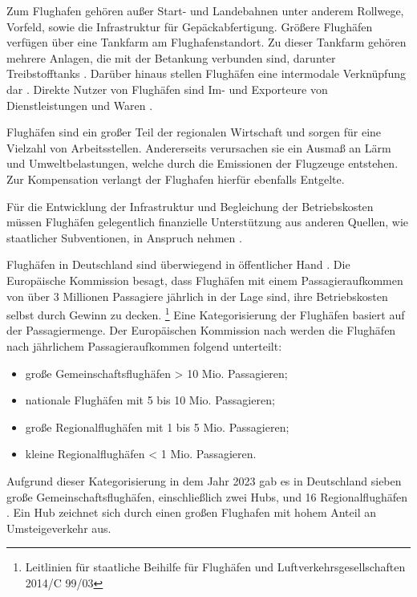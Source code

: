 Zum Flughafen gehören außer Start- und Landebahnen unter anderem 
Rollwege, Vorfeld, sowie die Infrastruktur für Gepäckabfertigung. 
Größere Flughäfen verfügen über eine Tankfarm am Flughafenstandort. 
Zu dieser Tankfarm gehören mehrere Anlagen, die mit der Betankung verbunden sind, darunter Treibstofftanks \cite{moriarty2024sustainable}.
Darüber hinaus stellen Flughäfen eine intermodale Verknüpfung dar \cite{conrady2019luftverkehr}. %
Direkte Nutzer von Flughäfen sind Im- und Exporteure von Dienstleistungen und Waren \cite{schaar2010analysis}. 

Flughäfen sind ein großer Teil der regionalen Wirtschaft \cite{schaar2010analysis} 
und sorgen für eine Vielzahl von Arbeitsstellen. 
Andererseits verursachen sie ein Ausmaß an Lärm und Umweltbelastungen, 
welche durch die Emissionen der Flugzeuge entstehen.
Zur Kompensation verlangt der Flughafen hierfür ebenfalls Entgelte. %

Für die Entwicklung der Infrastruktur und Begleichung der Betriebskosten müssen Flughäfen 
gelegentlich finanzielle Unterstützung aus anderen Quellen, wie staatlicher Subventionen, 
in Anspruch nehmen \cite{schaar2010analysis}. 

Flughäfen in Deutschland sind überwiegend in öffentlicher Hand \cite{conrady2019luftverkehr}.
Die Europäische Kommission besagt, dass Flughäfen mit einem Passagieraufkommen von über 3 Millionen 
Passagiere jährlich in der Lage sind, ihre Betriebskosten selbst durch Gewinn zu decken.
\footnote{\glqq Leitlinien für staatliche Beihilfe für Flughäfen und Luftverkehrsgesellschaften\grqq{} 2014/C 99/03}
Eine Kategorisierung der Flughäfen basiert auf der Passagiermenge. 
Der Europäischen Kommission nach werden die Flughäfen nach jährlichem Passagieraufkommen folgend unterteilt: 
\begin{itemize}
    \item große Gemeinschaftsflughäfen > 10 Mio. Passagieren;
    \item nationale Flughäfen mit 5 bis 10 Mio. Passagieren;
    \item große Regionalflughäfen mit 1 bis 5 Mio. Passagieren;
    \item kleine Regionalflughäfen < 1 Mio. Passagieren.
\end{itemize}
Aufgrund dieser Kategorisierung in dem Jahr 2023 gab es in Deutschland 
sieben große Gemeinschaftsflughäfen, einschließlich zwei Hubs, und 16 Regionalflughäfen \cite{Destatis_Luftverkehr_2024}.
Ein Hub zeichnet sich durch einen großen Flughafen mit hohem Anteil an Umsteigeverkehr aus.

